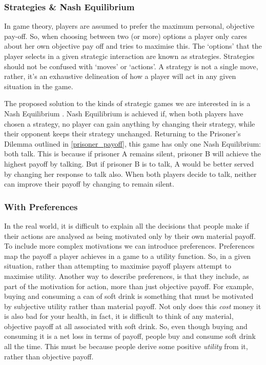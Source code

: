 \documentclass[11pt]{article}
\newcommand*{\np}{\par\noindent\newline}
\begin{document}
\subsubsection{Strategies \& Nash Equilibrium}
In game theory, players are assumed to prefer the maximum personal, objective
pay-off. So, when choosing between two (or more) options a player only cares
about her own objective pay off and tries to maximise this. The `options' that
the player selects in a given strategic interaction are known as strategies.
Strategies should not be confused with `moves' or `actions'. A strategy is not
a single move, rather, it's an exhaustive delineation of how a player will act
in any given situation in the game. 

\np The proposed solution to the kinds of strategic games we are interested in
is a Nash Equilibrium \cite{angner_course_2012}. Nash Equilibrium is achieved
if, when both players have chosen a strategy, no player can gain anything by
changing their strategy, while their opponent keeps their strategy unchanged.
Returning to the Prisoner's Dilemma outlined in \ref{prisoner_payoff}, this
game has only one Nash Equilibrium: both talk. This is because if prisoner A
remains silent, prisoner B will achieve the highest payoff by talking. But if
prisoner B is to talk, A would be better served by changing her response to
talk also. When both players decide to talk, neither can improve their payoff
by changing to remain silent.

\subsubsection{With Preferences}
In the real world, it is difficult to explain all the decisions that people
make if their actions are analysed as being motivated only by their own
material payoff. To include more complex motivations we can introduce
preferences. Preferences map the payoff a player achieves in a game to a
utility function. So, in a given situation, rather than attempting to maximise
payoff players attempt to maximise utility. Another way to describe
preferences, is that they include, as part of the motivation for action, more
than just objective payoff. For example, buying and consuming a can of soft
drink is something that must be motivated by subjective utility rather than
material payoff. Not only does this \textit{cost} money it is also bad for your
health, in fact, it is difficult to think of any material, objective payoff at
all associated with soft drink. So, even though buying and consuming it is a
net loss in terms of payoff, people buy and consume soft drink all the time.
This must be because people derive some positive \textit{utility} from it,
rather than objective payoff.
\end{document}
